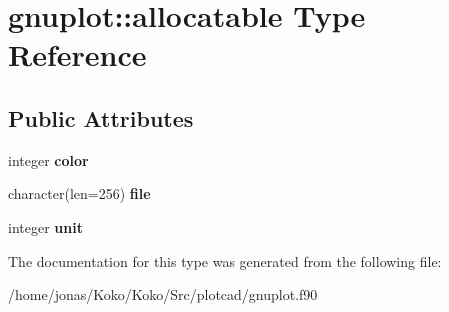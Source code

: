 \hypertarget{structgnuplot_1_1allocatable}{}\section{gnuplot\+:\+:allocatable Type Reference}
\label{structgnuplot_1_1allocatable}
\subsection*{Public Attributes}
\begin{DoxyCompactItemize}
\item 
\mbox{\label{structgnuplot_1_1allocatable_a14fefc47a74e3fe215ec91d24a210b7c}} 
integer {\bfseries color}
\item 
\mbox{\label{structgnuplot_1_1allocatable_a3da5519bcd322412ad19bce738cebfd5}} 
character(len=256) {\bfseries file}
\item 
\mbox{\label{structgnuplot_1_1allocatable_a31ea9eeb69344e5d016d43e6e941f87a}} 
integer {\bfseries unit}
\end{DoxyCompactItemize}


The documentation for this type was generated from the following file\+:\begin{DoxyCompactItemize}
\item 
/home/jonas/\+Koko/\+Koko/\+Src/plotcad/gnuplot.\+f90\end{DoxyCompactItemize}
